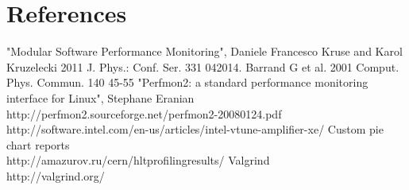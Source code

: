 \documentclass[a4paper]{jpconf}
\begin{document}
\section*{References}
\begin{thebibliography}{9}
 "Modular Software Performance Monitoring",  Daniele Francesco Kruse and Karol Kruzelecki 2011 J. 
Phys.: Conf. Ser. 331 042014. 
 Barrand G et al. 2001 Comput. Phys. Commun. 140 45-55
 "Perfmon2: a standard performance monitoring interface for Linux", Stephane Eranian\\
http://perfmon2.sourceforge.net/perfmon2-20080124.pdf
 \iamp \\ http://software.intel.com/en-us/articles/intel-vtune-amplifier-xe/
 Custom pie chart reports \\ http://amazurov.ru/cern/hltprofilingresults/
 Valgrind \\ http://valgrind.org/
\end{thebibliography}
\end{document}
